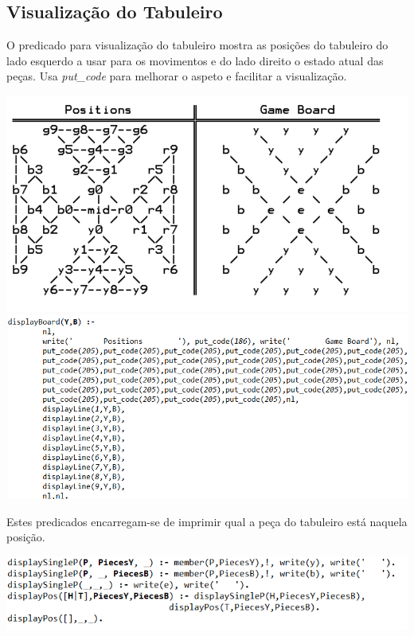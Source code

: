 \documentclass[a4paper]{article}
\begin{document}
\subsection{Visualização do Tabuleiro} O predicado para visualização do tabuleiro mostra as posições do tabuleiro do lado esquerdo a usar para os movimentos e do lado direito o estado atual das peças.  Usa \textit{put\_code} para melhorar o aspeto e facilitar a visualização. 

\includegraphics[scale=0.6]{gameBoard.png}\linebreak\linebreak
\includegraphics[scale=0.6]{displayBoard.png}\linebreak\linebreak

Estes predicados encarregam-se de imprimir qual a peça do tabuleiro está naquela posição. 

\includegraphics[scale=0.8]{displayBoard1.png}\linebreak\linebreak
\end{document}
